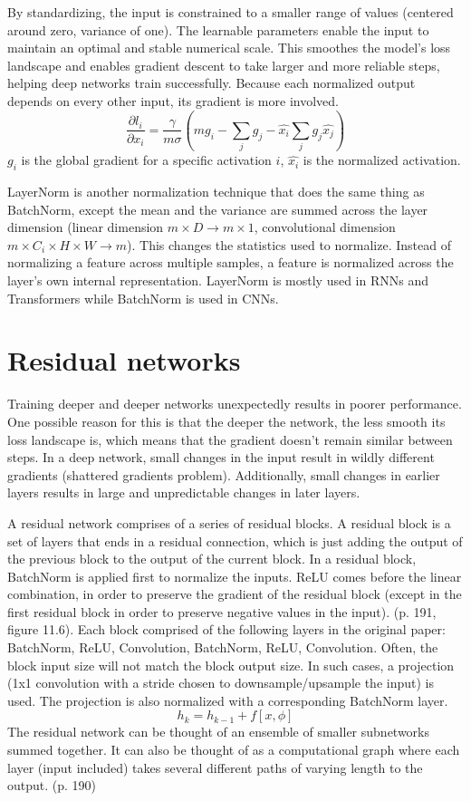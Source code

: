 \documentclass{article}
\begin{document}
By standardizing, the input is constrained to a smaller range of values (centered around zero, variance of one). The learnable parameters enable the input to maintain an optimal and stable numerical scale. This smoothes the model's loss landscape and enables gradient descent to take larger and more reliable steps, helping deep networks train successfully.
Because each normalized output depends on every other input, its gradient is more involved.
\[ \frac{\partial l_i}{\partial x_i} = \frac{\gamma}{m \sigma} \left( m g_i -  \sum_{j} g_j - \hat{x_i} \sum_{j} g_j \hat{x_j} \right) \]
$g_i$ is the global gradient for a specific activation $i$, $\hat{x_i}$ is the normalized activation.

LayerNorm is another normalization technique that does the same thing as BatchNorm, except the mean and the variance are summed across the layer dimension (linear dimension $m \times D \rightarrow m \times 1$, convolutional dimension $m \times C_i \times H \times W \rightarrow m$).
This changes the statistics used to normalize. Instead of normalizing a feature across multiple samples, a feature is normalized across the layer's own internal representation. LayerNorm is mostly used in RNNs and Transformers while BatchNorm is used in CNNs.

\section{Residual networks}
Training deeper and deeper networks unexpectedly results in poorer performance. One possible reason for this is that the deeper the network, the less smooth its loss landscape is, which means that the gradient doesn't remain similar between steps. In a deep network, small changes in the input result in wildly different gradients (shattered gradients problem). Additionally, small changes in earlier layers results in large and unpredictable changes in later layers.

A residual network comprises of a series of residual blocks. A residual block is a set of layers that ends in a residual connection, which is just adding the output of the previous block to the output of the current block. In a residual block, BatchNorm is applied first to normalize the inputs. ReLU comes before the linear combination, in order to preserve the gradient of the residual block (except in the first residual block in order to preserve negative values in the input). (p. 191, figure 11.6). Each block comprised of the following layers in the original paper: BatchNorm, ReLU, Convolution, BatchNorm, ReLU, Convolution.
Often, the block input size will not match the block output size. In such cases, a projection (1x1 convolution with a stride chosen to downsample/upsample the input) is used. The projection is also normalized with a corresponding BatchNorm layer.
\[ h_k = h_{k - 1} + f[x, \phi] \]
The residual network can be thought of an ensemble of smaller subnetworks summed together. It can also be thought of as a computational graph where each layer (input included) takes several different paths of varying length to the output. (p. 190)
\end{document}
